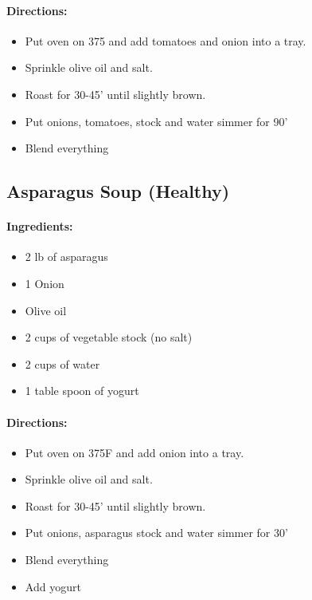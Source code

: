 \documentclass{article}
\begin{document}
\paragraph{Directions:}
\begin{itemize}
    \item Put oven on 375 and add tomatoes and onion into a tray.
    \item Sprinkle olive oil and salt.
    \item Roast for 30-45' until slightly brown.
    \item Put onions, tomatoes, stock and water simmer for 90'
    \item Blend everything
\end{itemize}

\subsection{Asparagus Soup (Healthy)}

\paragraph{Ingredients:}
\begin{itemize}
    \item 2 lb of asparagus
    \item 1 Onion
    \item Olive oil
    \item 2 cups of vegetable stock (no salt)
    \item 2 cups of water
    \item 1 table spoon of yogurt
\end{itemize}

\paragraph{Directions:}
\begin{itemize}
    \item Put oven on 375F and add onion into a tray.
    \item Sprinkle olive oil and salt.
    \item Roast for 30-45' until slightly brown.
    \item Put onions, asparagus stock and water simmer for 30'
    \item Blend everything
    \item Add yogurt
\end{itemize}
\end{document}
